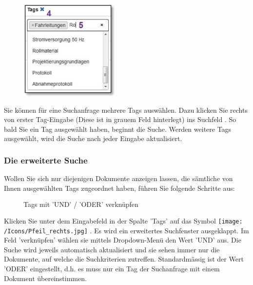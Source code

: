 \begin{figure}
\vspace{-15pt}
\includegraphics[height=50mm]{../chapters/11_Dokumentenablage/pictures/11-2-8_TagEingabe.jpg}
\end{figure}
Sie können für eine Suchanfrage mehrere Tags auswählen. Dazu klicken Sie rechts von erster Tag-Eingabe  (Diese ist in grauem Feld hinterlegt) ins Suchfeld . So bald Sie ein Tag ausgewählt haben, beginnt die Suche. Werden weitere Tags ausgewählt, wird die Suche nach jeder Eingabe aktualisiert. 

\vspace{1cm} 

\subsubsection{Die erweiterte Suche}

Wollen Sie sich nur diejenigen Dokumente anzeigen lassen, die sämtliche von Ihnen ausgewählten Tags zugeordnet haben, führen Sie folgende Schritte aus:

\begin{figure}[H]
\caption{Tags mit 'UND' / 'ODER' verknüpfen}
\end{figure}

Klicken Sie unter dem Eingabefeld in der Spalte 'Tags' auf das Symbol \texttt{[image: /Icons/Pfeil\_rechts.jpg]} . Es wird ein erweitertes Suchfenster ausgeklappt. Im Feld 'verknüpfen'  wählen sie mittels Dropdown-Menü den Wert 'UND'  aus. Die Suche wird jeweils automatisch aktualisiert und sie sehen immer nur die Dokumente, auf welche die Suchkriterien zutreffen. Standardmässig ist der Wert 'ODER' eingestellt, d.h. es muss nur ein Tag der Suchanfrage mit einem Dokument übereinstimmen. \newline

